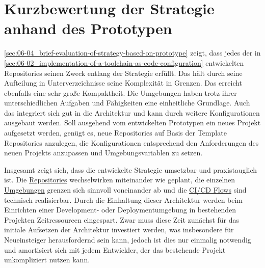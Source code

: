 \section{Kurzbewertung der Strategie anhand des Prototypen}
\label{sec:06-04_brief-evaluation-of-strategy-based-on-prototype}

\autoref{sec:06-04_brief-evaluation-of-strategy-based-on-prototype} zeigt, dass jedes der in \autoref{sec:06-02_implementation-of-a-toolchain-as-code-configuration} entwickelten Repositories seinen Zweck entlang der  Strategie erfüllt. Das  hält durch seine Aufteilung in Unterverzeichnisse seine Komplexität in Grenzen. Das  erreicht ebenfalls eine sehr große Kompaktheit. Die Umgebungen haben trotz ihrer unterschiedlichen Aufgaben und Fähigkeiten eine einheitliche Grundlage. Auch das  integriert sich gut in die Architektur und kann durch weitere Konfigurationen ausgebaut werden. Soll ausgehend vom entwickelten Prototypen ein neues Projekt aufgesetzt werden, genügt es, neue Repositories auf Basis der Template Repositories anzulegen, die Konfigurationen entsprechend den Anforderungen des neuen Projekts anzupassen und Umgebungsvariablen zu setzen.

Insgesamt zeigt sich, dass die entwickelte  Strategie umsetzbar und praxistauglich ist. Die \hyperref[subsubsec:05-02-02-01_data-storage-in-repositories]{Repositories} wechselwirken miteinander wie geplant, die einzelnen \hyperref[subsubsec:05-02-02-02_sub-components-in-environments]{Umgebungen} grenzen sich sinnvoll voneinander ab und die \hyperref[subsec:05-02-03_workflows-and-continuity-in-the-toolchain-as-code-approach]{CI/CD Flows} sind technisch realisierbar. Durch die Einhaltung dieser Architektur werden beim Einrichten einer Development- oder Deploymentumgebung in bestehenden Projekten Zeitressourcen eingespart. Zwar muss diese Zeit zunächst für das initiale Aufsetzen der Architektur investiert werden, was insbesondere für Neueinsteiger herausfordernd sein kann, jedoch ist dies nur einmalig notwendig und amortisiert sich mit jedem Entwickler, der das bestehende Projekt unkompliziert nutzen kann.

